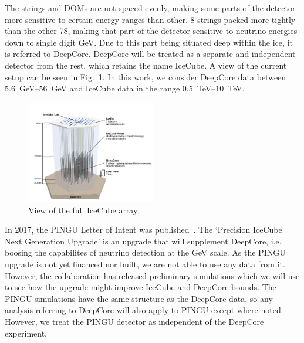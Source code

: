 The strings and DOMs are not spaced evenly, making some parts of the detector more sensitive to certain energy ranges than other.
8 strings packed more tightly than the other 78, making that part of the detector sensitive to neutrino energies down to single digit \si{\GeV}. Due to 
this part being situated deep within the ice, it is referred to DeepCore. DeepCore will be treated as a separate and independent detector from the rest, which
retains the name IceCube. A view of the current setup can be seen in Fig.~\ref{fig:array}. In this work, we consider DeepCore data between \SIrange{5.6}{56}{\GeV} and IceCube data in the range \SIrange{0.5}{10}{\TeV}.
\begin{figure}\label{fig:array}
    \centering
    \includegraphics[width=0.5\textwidth]{figures/icecube2.png}
    \caption{View of the full IceCube array}
\end{figure}

In 2017, the PINGU Letter of Intent was published~\cite{PINGUletter}. The `Precision IceCube Next Generation Upgrade' is an upgrade that will 
supplement DeepCore, i.e. boosing the capabilites of neutrino detection at the \si{\GeV} scale. As the PINGU upgrade is not yet financed nor built, we are
not able to use any data from it. However, the collaboration has released preliminary simulations which we will use to see how the upgrade might improve
IceCube and DeepCore bounds. The PINGU simulations have the same structure as the DeepCore data, so any analysis referring to DeepCore will
also apply to PINGU except where noted. However, we treat the PINGU detector as independent of the DeepCore experiment.


